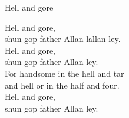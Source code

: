 \begin{song}{Hell and gore}
	
	
	
	Hell and gore,\\
	shun gop father Allan lallan ley.\\
	Hell and gore,\\
	shun gop father Allan ley.\\
	For handsome in the hell and tar\\
	and hell or in the half and four.\\
	Hell and gore,\\
	shun gop father Allan ley.
	
\end{song}
